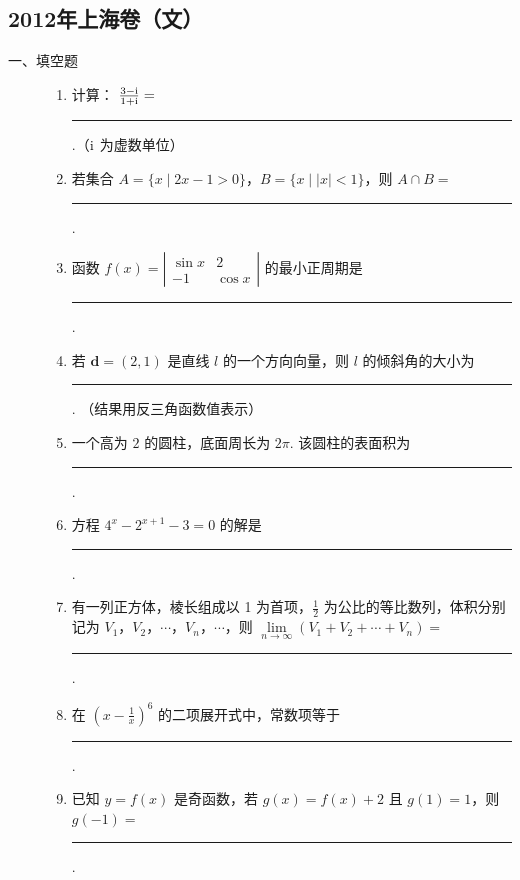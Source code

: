 \subsection{2012年上海卷（文）}\label{gk:2012年上海卷（文）}

\begin{description}

    \item[一、填空题]

    \begin{enumerate}[leftmargin=5pt]

        \item 计算： \(\frac{3 - \mathrm{i}}{1 + \mathrm{i}} =\)\rule[-0.3ex]{3em}{0.4pt}.（\(\mathrm{i}\) 为虚数单位）

        \item 若集合 \(A = \{x \mid 2x - 1 > 0\}\)，\(B = \{x \mid |x| < 1\}\)，则 \(A \cap B =\)\rule[-0.3ex]{3em}{0.4pt}.

        \item 函数 \( f(x) = \left| \begin{matrix} \sin x & 2 \\ -1 & \cos x \end{matrix} \right| \) 的最小正周期是\rule[-0.3ex]{3em}{0.4pt}.

        \item 若 \(\bm{d} = (2,1)\) 是直线 \(l\) 的一个方向向量，则 \(l\) 的倾斜角的大小为\rule[-0.3ex]{3em}{0.4pt}. （结果用反三角函数值表示）

        \item 一个高为 \(2\) 的圆柱，底面周长为 \(2\pi\). 该圆柱的表面积为\rule[-0.3ex]{3em}{0.4pt}.

        \item 方程 \(4^{x} - 2^{x + 1} - 3 = 0\) 的解是\rule[-0.3ex]{3em}{0.4pt}.

        \item 有一列正方体，棱长组成以 1 为首项，\(\frac{1}{2}\) 为公比的等比数列，体积分别记为 \(V_{1}\)，\(V_{2}\)，\(\cdots\)，\(V_{n}\)，\(\cdots\)，则 \(\lim\limits_{n \to \infty} (V_{1} + V_{2} + \cdots + V_{n}) =\)\rule[-0.3ex]{3em}{0.4pt}.

        \item 在 \(\left(x - \frac{1}{x}\right)^{6}\) 的二项展开式中，常数项等于\rule[-0.3ex]{3em}{0.4pt}.

        \item 已知 \( y = f(x) \) 是奇函数，若 \( g(x) = f(x) + 2 \) 且 \( g(1) = 1 \)，则 \( g(-1) = \)\rule[-0.3ex]{3em}{0.4pt}.


\end{enumerate}
\end{description}
